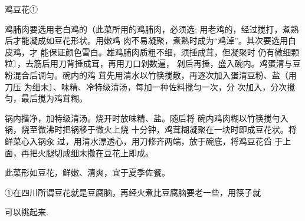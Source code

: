 \begin{recipe}{鸡豆花①}

\ingredients


\cooking

\step 鸡脯肉要选用老白鸡的（此菜所用的鸡脯肉，必须选; 用老鸡的，经过搅打，煮熟后才能凝成如豆花形状。用嫩鸡 肉不易凝聚，煮熟时成为“鸡淖”。其次要选用白皮鸡，才 能保证颜色雪白。雄鸡脯肉质粗不细，须捶成茸，但凝聚时 仍有微细颗粒〕，去筋后用刀背捶成茸，再用刀口剁数遍， 剁后再捶，盛入碗内。鸡蛋清与豆粉混合后调匀。碗内的鸡 茸先用清水以竹筷搅散，再逐次加入蛋清豆粉、盐（用刀压 为细末〕、味精、冷特级清汤，每加一种佐料搅匀一次，分 次加入，分次搅匀，最后搅为鸡茸糊。

\step 锅内揩净，加特级清汤。烧开时放味精、盐。随后将 碗内鸡肉糊以竹筷搅勻入锅，烧至微沸时把锅移于微火上烧 十分钟，鸡茸糊凝聚在一块时即成豆花状。将鲜菜心入锅汆 过，用清水漂透心，用刀修齐两端，放于碗底，将鸡豆花舀 于上面，再把火腿切成细末撒在豆花上即成。

\notes

此菜形如豆花，鲜嫩、清爽，宜于夏季佐餐。

①在四川所谓豆花就是豆腐脑，再经火煮比豆腐脑要老一些，用筷子就

可以挑起来.

\end{recipe}

